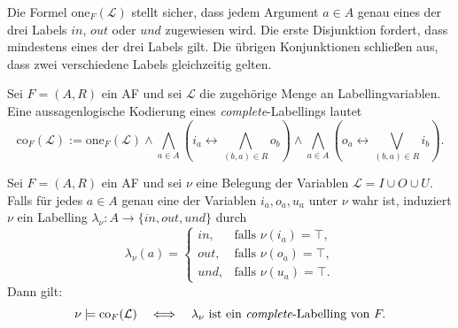 Die Formel \(\mathrm{one}_F(\mathcal{L})\) stellt sicher, dass jedem Argument
\(a \in A\) genau eines der drei Labels \(\mathit{in}\), \(\mathit{out}\)
oder \(\mathit{und}\) zugewiesen wird. Die erste Disjunktion fordert,
dass mindestens eines der drei Labels gilt. Die übrigen Konjunktionen
schließen aus, dass zwei verschiedene Labels gleichzeitig gelten.



\begin{Definition}
    \label{def:co-pl}
     Sei \(F = (A,R)\) ein AF und sei \(\mathcal{L}\) die zugehörige Menge an Labellingvariablen. 
     Eine aussagenlogische Kodierung eines \textit{complete}-Labellings lautet
     \[
     \mathrm{co}_F(\mathcal{L})
        :=
        \mathrm{one}_F(\mathcal{L})
        \land 
        \bigwedge_{a\in A}
        (
            i_a
            \leftrightarrow
            \bigwedge_{(b,a)\in R} o_b
        )
        \land
        \bigwedge_{a\in A}
        (
            o_a
            \leftrightarrow
            \bigvee_{(b,a)\in R} i_b
        ).
     \]
\end{Definition}

\begin{Lemma}
    \label{lem:co-pl-correct}
    Sei \(F=(A,R)\) ein AF und sei \(\nu\) eine Belegung der Variablen
    \(\mathcal{L}= I\cup O\cup U\). Falls für jedes \(a\in A\) genau eine der
    Variablen \(i_a,o_a,u_a\) unter \(\nu\) wahr ist, induziert \(\nu\)
    ein Labelling \(\lambda_\nu:A\to
    \{\mathit{in},\mathit{out},\mathit{und}\}\) durch
    \[
        \lambda_\nu(a)=
        \begin{cases}
            \mathit{in}, & \text{falls } \nu(i_a)=\top,\\
            \mathit{out}, & \text{falls } \nu(o_a)=\top,\\
            \mathit{und}, & \text{falls } \nu(u_a)=\top.
        \end{cases}
    \]
    Dann gilt:
    \[
        \nu\models \mathrm{co}_F(\mathcal{L})
        \quad\Longleftrightarrow\quad
        \lambda_\nu
        \text{ ist ein \textit{complete}-Labelling von } F.
    \]
\end{Lemma}

